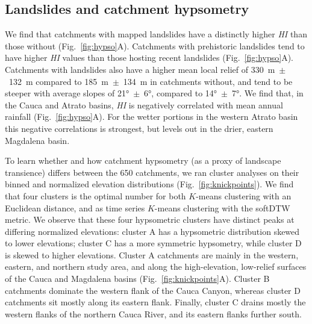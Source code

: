 \documentclass[draft]{agujournal2019}
\begin{document}
\subsection{Landslides and catchment hypsometry}

\par We find that catchments with mapped landslides have a distinctly higher \textit{HI} than those without (Fig.~\ref{fig:hypso}A). Catchments with prehistoric landslides tend to have higher \textit{HI} values than those hosting recent landslides (Fig.~\ref{fig:hypso}A). Catchments with landslides also have a higher mean local relief of 330~m~$\pm$~132~m compared to 185~m~$\pm$~134~m in catchments without, and tend to be steeper with average slopes of 21°~$\pm$~6°, compared to 14°~$\pm$~7°. We find that, in the Cauca and Atrato basins, \textit{HI} is negatively correlated with mean annual rainfall (Fig.~\ref{fig:hypso}A). For the wetter portions in the western Atrato basin this negative correlations is strongest, but levels out in the drier, eastern Magdalena basin. 

\par To learn whether and how catchment hypsometry (as a proxy of landscape transience) differs between the 650 catchments, we ran cluster analyses on their binned and normalized elevation distributions (Fig.~\ref{fig:knickpoints}). We find that four clusters is the optimal number for both $K$-means clustering with an Euclidean distance, and as time series $K$-means clustering with the softDTW metric. We observe that these four hypsometric clusters have distinct peaks at differing normalized elevations: cluster A has a hypsometric distribution skewed to lower elevations; cluster C has a more symmetric hypsometry, while cluster D is skewed to higher elevations. Cluster A catchments are mainly in the western, eastern, and northern study area, and along the high-elevation, low-relief surfaces of the Cauca and Magdalena basins (Fig.~\ref{fig:knickpoints}A). Cluster B catchments dominate the western flank of the Cauca Canyon, whereas cluster D catchments sit mostly along its eastern flank. Finally, cluster C drains mostly the western flanks of the northern Cauca River, and its eastern flanks further south. 
\end{document}
